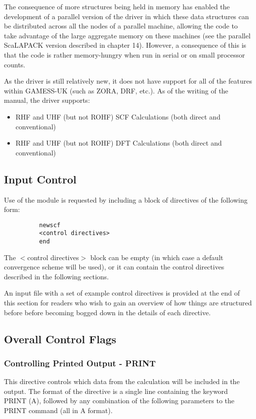 \documentclass[11pt,fleqn]{article}
\begin{document}
The consequence of more structures being held in memory has enabled
the development of a parallel version of the driver in
which these data structures can be distributed across all the nodes of
a parallel machine, allowing the code to take advantage of the large
aggregate memory on these machines (see the parallel ScaLAPACK version
described in chapter 14). However, a consequence of this is that the
code is rather memory-hungry when run in serial or on small processor
counts.

As the driver is still relatively new, it does not have support for
all of the features within GAMESS-UK (such as ZORA, DRF, etc.). As of
the writing of the manual, the driver supports:

\begin{itemize}
\item RHF and UHF (but not ROHF) SCF Calculations (both direct and conventional)
\item RHF and UHF (but not ROHF) DFT Calculations (both direct and conventional)
\end{itemize}

\subsection[Input Control]{Input Control}
Use of the module is requested by including a block of directives of the
following form:

{
\footnotesize
\begin{verbatim}
          newscf
          <control directives>
          end
\end{verbatim}
}

The $<$control directives$>$ block can be empty (in which case a default
convergence scheme will be used), or it can contain the control
directives described in the following sections.

An input file with a set of example control directives is provided at
the end of this section for readers who wish to gain an overview of
how things are structured before before becoming bogged down in the
details of each directive.

\subsection[Overall Control Flags]{Overall Control Flags}

\subsubsection{Controlling Printed Output - PRINT}
This directive controls which data from the calculation will be
included in the output. The format of the directive is a single line
containing the keyword PRINT (A), followed by any combination of the
following parameters to the PRINT command (all in A format).
\end{document}
